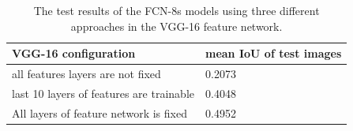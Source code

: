 \documentclass[extendedabs]{bmvc2k}
\begin{document}
\begin{table}[t]
\centering
\begin{tabular}{|l|l|}
\hline
VGG-16 configuration                     & mean IoU of test images \\ \hline
all features layers are not fixed        & 0.2073                 \\ \hline
last 10 layers of features are trainable & 0.4048                  \\ \hline
All layers of feature network is fixed      & 0.4952                  \\ \hline
\end{tabular}
\caption{The test results of the FCN-8s models using three different approaches in the VGG-16 feature network.}
\label{tab:fcn8sresult}
\end{table}
\end{document}
